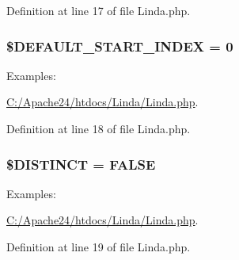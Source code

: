 Definition at line 17 of file Linda.\+php.

\hypertarget{class_linda_a803cce07cc3e3f9937b6e5faba4100fe}{}
\subsubsection[{\$\+D\+E\+F\+A\+U\+L\+T\+\_\+\+S\+T\+A\+R\+T\+\_\+\+I\+N\+D\+E\+X}]{\setlength{\rightskip}{0pt plus 5cm}\$D\+E\+F\+A\+U\+L\+T\+\_\+\+S\+T\+A\+R\+T\+\_\+\+I\+N\+D\+E\+X = 0\hspace{0.3cm}{\ttfamily [protected]}}\label{class_linda_a803cce07cc3e3f9937b6e5faba4100fe}
\begin{Desc}
\item[Examples\+: ]\par
\hyperlink{_c_1_2_apache24_2htdocs_2_linda_2_linda_8php-example}{C\+:/\+Apache24/htdocs/\+Linda/\+Linda.\+php}.\end{Desc}


Definition at line 18 of file Linda.\+php.

\hypertarget{class_linda_a8df0f16d4226b986c460429c8784ee3e}{}
\subsubsection[{\$\+D\+I\+S\+T\+I\+N\+C\+T}]{\setlength{\rightskip}{0pt plus 5cm}\$D\+I\+S\+T\+I\+N\+C\+T = F\+A\+L\+S\+E\hspace{0.3cm}{\ttfamily [protected]}}\label{class_linda_a8df0f16d4226b986c460429c8784ee3e}
\begin{Desc}
\item[Examples\+: ]\par
\hyperlink{_c_1_2_apache24_2htdocs_2_linda_2_linda_8php-example}{C\+:/\+Apache24/htdocs/\+Linda/\+Linda.\+php}.\end{Desc}


Definition at line 19 of file Linda.\+php.

\hypertarget{class_linda_a038edab690e03aff9c70a1f63c06f27e}{}
